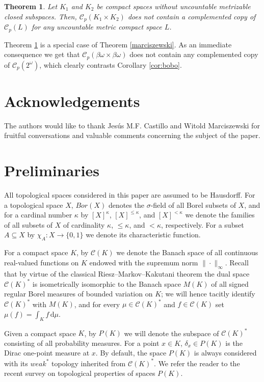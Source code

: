 \documentclass[12pt,fleqn]{amsart}
\numberwithin{equation}{section}
\newtheorem{thm}{Theorem}[section]
\theoremstyle{definition}
\def\C{\mathcal C}
\newcommand{\bobo}{\beta\omega\times\beta\omega}
\begin{document}
\begin{thm}\label{thm_cp}
    Let $K_1$ and $K_2$ be compact spaces without uncountable metrizable closed subspaces. Then, $\C_p(K_1\times K_2)$ does not contain a complemented copy of $\C_p(L)$ for any uncountable metric compact space $L$.  
\end{thm}

Theorem \ref{thm_cp} is a special case of Theorem \ref{marciszewski}. As an immediate consequence we get that $\C_p(\bobo)$ does not contain any complemented copy of $\C_p(2^\omega)$, which clearly contrasts Corollary \ref{cor:bobo}.

\section*{Acknowledgements}

The authors would like to thank Jes\'us M.F. Castillo and Witold Marciszewski for fruitful conversations and valuable comments concerning the subject of the paper.

\section{Preliminaries}

 All topological spaces considered in this paper are assumed to be Hausdorff. For a topological space $X$, $Bor(X)$ denotes the $\sigma$-field of all Borel subsets of $X$, and for a cardinal number $\kappa$ by $[X]^\kappa$, $[X]^{\le\kappa}$, and $[X]^{<\kappa}$ we denote the families of all subsets of $X$ of cardinality $\kappa$, $\le\kappa$, and $<\kappa$, respectively. For a subset $A\subseteq X$ by $\chi_A\colon X\to\{0,1\}$ we denote its characteristic function.
 
 For a compact space $K$, by $\C(K)$ we denote the Banach space of all continuous real-valued functions on $K$ endowed with the supremum norm $\|\cdot\|_\infty$. Recall that by virtue of the classical Riesz--Markov--Kakutani theorem the dual space $\C(K)^\ast$ is isometrically isomorphic to the Banach space $M(K)$ of all signed regular Borel measures of bounded variation on $K$; we will hence tacitly identify $\C(K)^\ast$ with $M(K)$, and for every $\mu\in\C(K)^\ast$ and $f\in\C(K)$ set $\mu(f)=\int_K f\,\mathrm{d}\mu$.

 Given a compact space $K$, by $P(K)$ we will denote the subspace of $\C(K)^\ast$ consisting of all probability measures. For a point $x\in K$, $\delta_x\in P(K)$ is the Dirac one-point measure at $x$.  
 By default, the space $P(K)$ is always considered with its $weak^\ast$ topology inherited from $\C(K)^\ast$.
 We refer the reader to the recent survey \cite{Pl23} on topological properties of spaces $P(K)$. 
\end{document}
